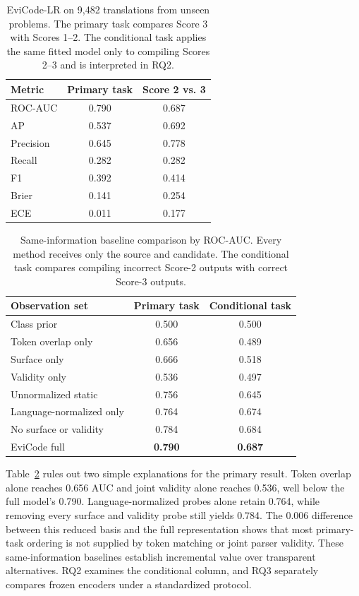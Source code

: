 \documentclass[conference]{IEEEtran}
\begin{document}
\begin{table}[t]
\centering
\caption{EviCode-LR on 9,482 translations from unseen problems. The primary task compares Score 3 with Scores 1--2. The conditional task applies the same fitted model only to compiling Scores 2--3 and is interpreted in RQ2.}
\label{tab:main}
\begin{tabular}{@{}lcc@{}}
\toprule
Metric & Primary task & Score 2 vs. 3 \\
\midrule
ROC-AUC & 0.790 & 0.687 \\
AP & 0.537 & 0.692 \\
Precision & 0.645 & 0.778 \\
Recall & 0.282 & 0.282 \\
F1 & 0.392 & 0.414 \\
Brier & 0.141 & 0.254 \\
ECE & 0.011 & 0.177 \\
\bottomrule
\end{tabular}
\end{table}

\begin{table}[t]
\centering
\caption{Same-information baseline comparison by ROC-AUC. Every method receives only the source and candidate. The conditional task compares compiling incorrect Score-2 outputs with correct Score-3 outputs.}
\label{tab:baselines}
\begin{tabular}{@{}lcc@{}}
\toprule
Observation set & Primary task & Conditional task \\
\midrule
Class prior & 0.500 & 0.500 \\
Token overlap only & 0.656 & 0.489 \\
Surface only & 0.666 & 0.518 \\
Validity only & 0.536 & 0.497 \\
Unnormalized static & 0.756 & 0.645 \\
Language-normalized only & 0.764 & 0.674 \\
No surface or validity & 0.784 & 0.684 \\
EviCode full & \textbf{0.790} & \textbf{0.687} \\
\bottomrule
\end{tabular}
\end{table}

Table~\ref{tab:baselines} rules out two simple explanations for the primary result. Token overlap alone reaches 0.656 AUC and joint validity alone reaches 0.536, well below the full model's 0.790. Language-normalized probes alone retain 0.764, while removing every surface and validity probe still yields 0.784. The 0.006 difference between this reduced basis and the full representation shows that most primary-task ordering is not supplied by token matching or joint parser validity. These same-information baselines establish incremental value over transparent alternatives. RQ2 examines the conditional column, and RQ3 separately compares frozen encoders under a standardized protocol.
\end{document}
